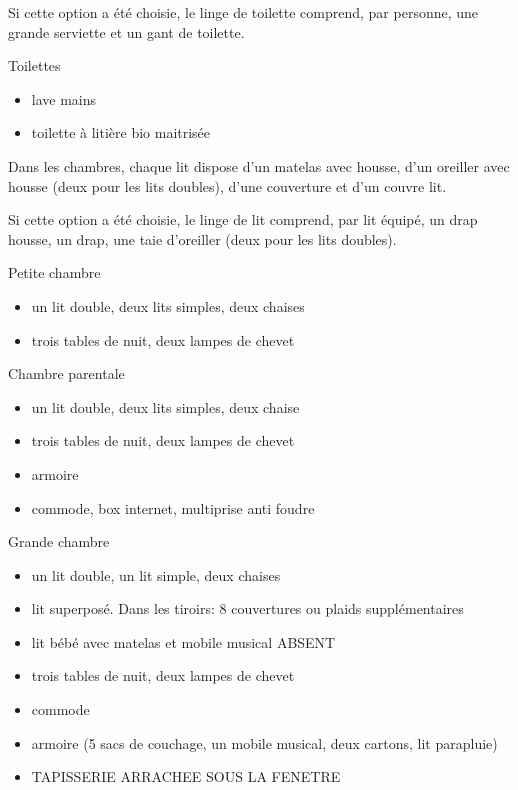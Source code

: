 \documentclass[a4paper,11pt]{article}
\begin{document}
Si cette option a été choisie, le linge de toilette comprend, par personne, une grande serviette et un gant de toilette.
\vspace{0.5cm}

Toilettes
\begin{itemize}
\item lave mains
\item toilette à litière bio maitrisée
\end{itemize}


\vspace{0.25cm}

Dans les chambres, chaque lit dispose d'un matelas avec housse, d'un oreiller avec housse (deux pour les lits doubles),  d'une couverture et d'un couvre lit.

Si cette option a été choisie, le linge de lit comprend, par lit équipé, un drap housse, un drap, une taie d'oreiller (deux pour les lits doubles). 

\vspace{0.5cm}

Petite chambre
\begin{itemize}
\item un lit double, deux lits simples, deux chaises
\item trois tables de nuit, deux lampes de chevet 
\end{itemize}
\vspace{0.25cm}

Chambre parentale
\begin{itemize}
\item un lit double, deux lits simples, deux chaise
\item trois tables de nuit, deux lampes de chevet 
\item armoire 
\item commode, box internet, multiprise anti foudre
\end{itemize}

\vspace{0.5cm}

Grande chambre
\begin{itemize}
\item un lit double, un lit simple, deux chaises
\item lit superposé. Dans les tiroirs: 8 couvertures ou plaids supplémentaires
\item lit bébé avec matelas et mobile musical ABSENT
\item trois tables de nuit, deux lampes de chevet
\item commode
\item armoire (5 sacs de couchage, un mobile musical, deux cartons, lit parapluie)
\item TAPISSERIE ARRACHEE SOUS LA FENETRE
\end{itemize}
\end{document}
